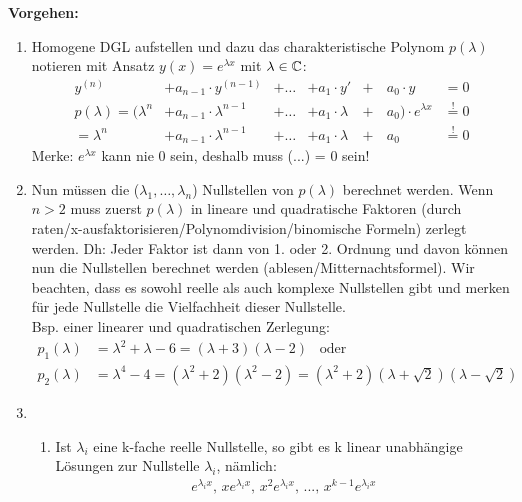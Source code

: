 \textbf{Vorgehen:}
\begin{enumerate}
	\item Homogene DGL aufstellen und dazu das charakteristische Polynom $p(\lambda)$ notieren mit Ansatz $y(x) = e^{\lambda x}$ mit $\lambda \in \mathbb{C}$:
	\begin{align*}
		y^{(n)} &+ a_{n-1} \cdot y^{(n-1)} &+ \ldots &+ a_1 \cdot y' &+& \, a_0 \cdot y&=0\\
		p(\lambda) = (\lambda^n &+ a_{n-1} \cdot \lambda^{n-1} &+ \ldots &+ a_1 \cdot \lambda &+& \, a_0) \cdot e^{\lambda x} &\overset{!}{=} 0 \\
		= \lambda^n &+ a_{n-1} \cdot \lambda^{n-1} &+ \ldots &+ a_1 \cdot \lambda &+& \, a_0 &\overset{!}{=} 0
	\end{align*}
	Merke: $e^{\lambda x}$ kann nie 0 sein, deshalb muss (...) = 0 sein!\\

	\item Nun müssen die ($\lambda_1, \ldots, \lambda_n$) Nullstellen von $p(\lambda)$ berechnet werden. Wenn $n > 2$ muss zuerst $p(\lambda)$ in lineare und quadratische Faktoren (durch raten/x-ausfaktorisieren/Polynomdivision/binomische Formeln) zerlegt werden. Dh: Jeder Faktor ist dann von 1. oder 2. Ordnung und davon können nun die Nullstellen berechnet werden (ablesen/Mitternachtsformel). Wir beachten, dass es sowohl reelle als auch komplexe Nullstellen gibt und merken für jede Nullstelle die Vielfachheit dieser Nullstelle.\\
	Bsp. einer linearer und quadratischen Zerlegung:
	{\small \begin{align*}
			p_1(\lambda) &= \lambda^2 + \lambda - 6 = (\lambda + 3) (\lambda - 2) \hspace{10pt} \text{oder} \\
			p_2(\lambda) &= \lambda^4 -4 = (\lambda^2 + 2) (\lambda^2 - 2) = (\lambda^2 + 2) (\lambda + \sqrt{2}) (\lambda - \sqrt{2})
	\end{align*}}
	\item 
	\begin{enumerate}[leftmargin=0.3cm]
		\item Ist $\lambda_i$ eine k-fache reelle Nullstelle, so gibt es k linear unabhängige Lösungen zur Nullstelle $\lambda_i$, nämlich:
		\vspace{3pt}
		\begin{align*}
			e^{\lambda_i x}, \, x e^{\lambda_i x}, \, x^2 e^{\lambda_i x}, \, ... , \, x^{k-1} e^{\lambda_i x}
		\end{align*}


\end{enumerate}
\end{enumerate}
